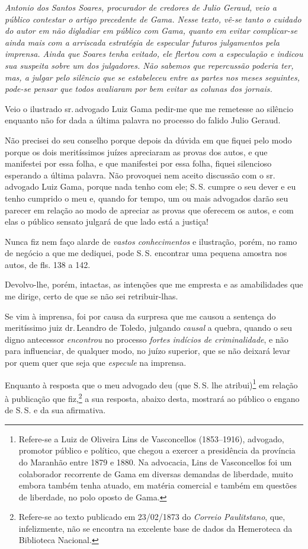 \begin{didascalia}
\emph{Antonio dos Santos Soares, procurador de credores de Julio Geraud,
veio a público contestar o artigo precedente de Gama. Nesse texto, vê-se
tanto o cuidado do autor em não digladiar em público com Gama, quanto em
evitar complicar-se ainda mais com a arriscada estratégia de especular
futuros julgamentos pela imprensa. Ainda que Soares tenha evitado, ele
flertou com a especulação e indicou sua suspeita sobre um dos
julgadores. Não sabemos que repercussão poderia ter, mas, a julgar pelo
silêncio que se estabeleceu entre as partes nos meses seguintes, pode-se
pensar que todos avaliaram por bem evitar as colunas dos jornais.}
\end{didascalia}

Veio o ilustrado sr.\,advogado Luiz Gama pedir-me que me remetesse ao
silêncio enquanto não for dada a última palavra no processo do falido
Julio Geraud.

Não precisei do seu conselho porque depois da dúvida em que fiquei pelo
modo porque os dois meritíssimos juízes apreciaram as provas dos autos,
e que manifestei por essa folha, e que manifestei por essa folha, fiquei
silencioso esperando a última palavra. Não provoquei nem aceito
discussão com o sr.\,advogado Luiz Gama, porque nada tenho com ele; S.\,S.
cumpre o seu dever e eu tenho cumprido o meu e, quando for tempo, um ou
mais advogados darão seu parecer em relação ao modo de apreciar as
provas que oferecem os autos, e com elas o público sensato julgará de
que lado está a justiça!

Nunca fiz nem faço alarde de \emph{vastos conhecimentos} e ilustração,
porém, no ramo de negócio a que me dediquei, pode S.\,S. encontrar uma
pequena amostra nos autos, de fls. 138 a 142.

Devolvo-lhe, porém, intactas, as intenções que me empresta e as
amabilidades que me dirige, certo de que se não sei retribuir-lhas.

Se vim à imprensa, foi por causa da surpresa que me causou a sentença do
meritíssimo juiz dr.\,Leandro de Toledo, julgando \emph{causal} a quebra,
quando o seu digno antecessor \emph{encontrou} no processo \emph{fortes
indícios de criminalidade}, e não para influenciar, de qualquer modo, no
juízo superior, que se não deixará levar por quem quer que seja que
\emph{especule} na imprensa.

Enquanto à resposta que o meu advogado deu (que S.\,S. lhe
atribui)\footnote{ Refere-se a Luiz de Oliveira Lins de Vasconcellos
  (1853--1916), advogado, promotor público e político, que chegou a
  exercer a presidência da província do Maranhão entre 1879 e 1880. Na
  advocacia, Lins de Vasconcellos foi um colaborador recorrente de Gama
  em diversas demandas de liberdade, muito embora também tenha atuado,
  em matéria comercial e também em questões de liberdade, no polo oposto
  de Gama.} em relação à publicação que fiz,\footnote{ Refere-se ao
  texto publicado em 23/02/1873 do \emph{Correio Paulitstano}, que,
  infelizmente, não se encontra na excelente base de dados da Hemeroteca
  da Biblioteca Nacional.} a sua resposta, abaixo desta, mostrará ao
público o engano de S.\,S. e da sua afirmativa.


